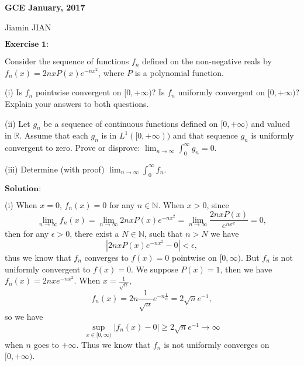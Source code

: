 \documentclass[12pt,a4paper]{ctexart}
\begin{document}
\begin{center}
\textbf{ GCE January, 2017}
\vspace{8pt}

Jiamin JIAN
\end{center}

\vspace{12pt}

$\textbf{Exercise 1:}$

Consider the sequence of functions $f_{n}$ defined on the non-negative reals by $f_{n} (x) = 2 n x P(x) e^{-n x^{2}}$, where $P$ is a polynomial function.

(i) Is $f_{n}$ pointwise convergent on $[0, + \infty)$? Is $f_{n}$ uniformly convergent on $[0, + \infty)$? Explain your answers to both questions.

(ii) Let $g_{n}$ be a sequence of continuous functions defined on $[0, + \infty)$ and valued in $\mathbb{R}$. Assume that each $g_{n}$ is in $L^{1}([0, + \infty))$ and that sequence $g_{n}$ is uniformly convergent to zero. Prove or disprove: $\lim_{n \to \infty} \int_{0}^{\infty} g_{n} = 0$. 

(iii) Determine (with proof) $\lim_{n \to \infty} \int_{0}^{\infty}  f_{n}$.
  
\vspace{8pt}

$\textbf{Solution:}$

(i) When $x = 0$, $f_{n} (x) = 0$ for any $n \in \mathbb{N}$. When $x > 0$, since
\begin{equation*}
    \lim_{n \to \infty} f_{n} (x) = \lim_{n \to \infty} 2 n x P(x) e^{-n x^{2}} = \lim_{n \to \infty} \frac{2 n x P(x)}{e^{n x^{x}}} = 0,
\end{equation*}
then for any $\epsilon > 0$, there exist a $N \in \mathbb{N}$, such that $n > N$ we have 
\begin{equation*}
    |2 n x P(x) e^{- n x^{2}} - 0| < \epsilon,
\end{equation*}
thus we know that $f_{n}$ converges to $f(x) = 0$ pointwise on $[0, \infty)$. But $f_{n}$ is not uniformly convergent to $f(x) = 0$. We suppose $P(x) = 1$, then we have $f_{n}(x) = 2 n x e^{-n x^{2}} $. When $x = \frac{1}{\sqrt{n}}$, 
\begin{equation*}
    f_{n} (x) = 2 n \frac{1}{\sqrt{n}} e^{- n \frac{1}{n}} = 2 \sqrt{n} e^{-1},
\end{equation*}
so we have
\begin{equation*}
    \sup_{x \in [0, \infty)} |f_{n} (x) - 0| \geq 2 \sqrt{n} e^{-1} \to \infty
\end{equation*}
when $n$ goes to $+ \infty$. Thus we know that $f_{n}$ is not uniformly converges on $[0, + \infty)$. 
\end{document}
